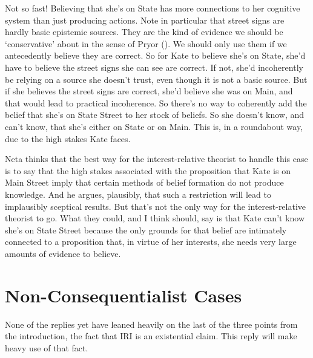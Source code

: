 \documentclass[
  11pt,
  letterpaper,
  DIV=11,
  numbers=noendperiod,
  oneside]{scrartcl}
\begin{document}
Not so fast! Believing that she's on State has more connections to her
cognitive system than just producing actions. Note in particular that
street signs are hardly basic epistemic sources. They are the kind of
evidence we should be `conservative' about in the sense of Pryor
(). We should only use them if we
antecedently believe they are correct. So for Kate to believe she's on
State, she'd have to believe the street signs she can see are correct.
If not, she'd incoherently be relying on a source she doesn't trust,
even though it is not a basic source. But if
she believes the street signs are correct, she'd believe she was on
Main, and that would lead to practical incoherence. So there's no way to
coherently add the belief that she's on State Street to her stock of
beliefs. So she doesn't know, and can't know, that she's either on State
or on Main. This is, in a roundabout way, due to the high stakes Kate
faces.

Neta thinks that the best way for the interest-relative theorist to
handle this case is to say that the high stakes associated with the
proposition that Kate is on Main Street imply that certain methods of
belief formation do not produce knowledge. And he argues, plausibly,
that such a restriction will lead to implausibly sceptical results. But
that's not the only way for the interest-relative theorist to go. What
they could, and I think should, say is that Kate can't know she's on
State Street because the only grounds for that belief are intimately
connected to a proposition that, in virtue of her interests, she needs
very large amounts of evidence to believe.

\section{Non-Consequentialist Cases}\label{non-consequentialist-cases}

None of the replies yet have leaned heavily on the last of the three
points from the introduction, the fact that IRI is an existential claim.
This reply will make heavy use of that fact.
\end{document}
